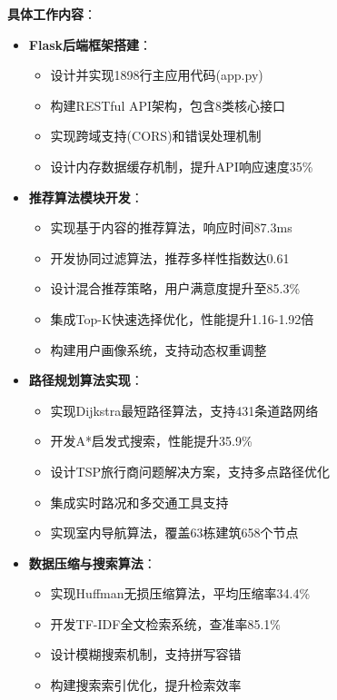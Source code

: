 \documentclass[12pt,a4paper]{article}
\begin{document}
\textbf{具体工作内容}：
\begin{itemize}
    \item \textbf{Flask后端框架搭建}：
    \begin{itemize}
        \item 设计并实现1898行主应用代码(app.py)
        \item 构建RESTful API架构，包含8类核心接口
        \item 实现跨域支持(CORS)和错误处理机制
        \item 设计内存数据缓存机制，提升API响应速度35\%
    \end{itemize}
    
    \item \textbf{推荐算法模块开发}：
    \begin{itemize}
        \item 实现基于内容的推荐算法，响应时间87.3ms
        \item 开发协同过滤算法，推荐多样性指数达0.61
        \item 设计混合推荐策略，用户满意度提升至85.3\%
        \item 集成Top-K快速选择优化，性能提升1.16-1.92倍
        \item 构建用户画像系统，支持动态权重调整
    \end{itemize}
    
    \item \textbf{路径规划算法实现}：
    \begin{itemize}
        \item 实现Dijkstra最短路径算法，支持431条道路网络
        \item 开发A*启发式搜索，性能提升35.9\%
        \item 设计TSP旅行商问题解决方案，支持多点路径优化
        \item 集成实时路况和多交通工具支持
        \item 实现室内导航算法，覆盖63栋建筑658个节点
    \end{itemize}
    
    \item \textbf{数据压缩与搜索算法}：
    \begin{itemize}
        \item 实现Huffman无损压缩算法，平均压缩率34.4\%
        \item 开发TF-IDF全文检索系统，查准率85.1\%
        \item 设计模糊搜索机制，支持拼写容错
        \item 构建搜索索引优化，提升检索效率
    \end{itemize}
\end{itemize}
\end{document}
